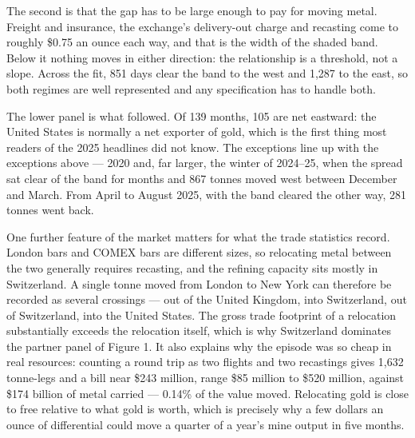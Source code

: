 \documentclass[11pt]{article}
\begin{document}
The second is that the gap has to be large enough to pay for moving metal.
Freight and insurance, the exchange's delivery-out charge and recasting come to
roughly \$0.75 an ounce each way, and that is the width of the shaded band.
Below it nothing moves in either direction: the relationship is a threshold,
not a slope. Across the fit, 851 days clear the band to the west and 1,287 to
the east, so both regimes are well represented and any specification has to
handle both.

The lower panel is what followed. Of 139 months, 105 are net eastward: the
United States is normally a net exporter of gold, which is the first thing most
readers of the 2025 headlines did not know. The exceptions line up with the
exceptions above --- 2020 and, far larger, the winter of 2024--25, when the
spread sat clear of the band for months and 867 tonnes moved west between
December and March. From April to August 2025, with the band cleared the other
way, 281 tonnes went back.

One further feature of the market matters for what the trade statistics record.
London bars and COMEX bars are different sizes, so relocating metal between the
two generally requires recasting, and the refining capacity sits mostly in
Switzerland. A single tonne moved from London to New York can therefore be
recorded as several crossings --- out of the United Kingdom, into Switzerland,
out of Switzerland, into the United States. The gross trade footprint of a
relocation substantially exceeds the relocation itself, which is why
Switzerland dominates the partner panel of Figure 1. It also explains why the
episode was so cheap in real resources: counting a round trip as two flights
and two recastings gives 1,632 tonne-legs and a bill near \$243 million, range
\$85 million to \$520 million, against \$174 billion of metal carried ---
0.14\% of the value moved.
Relocating gold is close to free relative to what gold is worth, which is
precisely why a few dollars an ounce of differential could move a quarter of a
year's mine output in five months.
\end{document}
